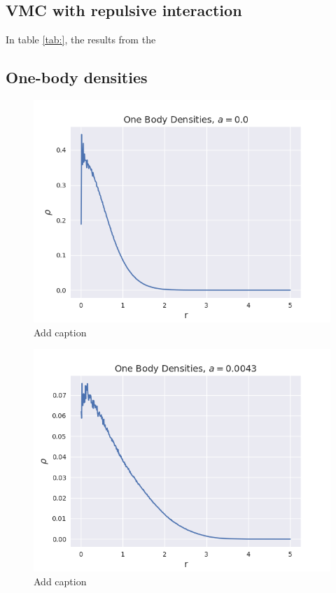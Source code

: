 \documentclass[norsk,a4paper,12pt]{article}
\begin{document}
\subsection{VMC with repulsive interaction}
In table \ref{tab:}, the results from the 

\subsection{One-body densities}
\begin{figure} [H]
    \centering
    \includegraphics[scale=0.65]{images/ob_a_0.png}
    \caption{Add caption}
    \label{fig:ob0}
\end{figure} 

\begin{figure} [H]
    \centering
    \includegraphics[scale=0.65]{images/ob_a_00043.png}
    \caption{Add caption}
    \label{fig:ob00043}
\end{figure} 
\end{document}
